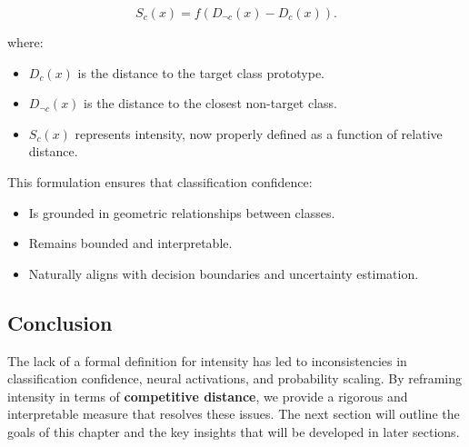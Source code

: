 \[
S_c(x) = f(D_{\neg c}(x) - D_c(x)).
\]

where:

\begin{itemize}
    \item \( D_c(x) \) is the distance to the target class prototype.
    \item \( D_{\neg c}(x) \) is the distance to the closest non-target class.
    \item \( S_c(x) \) represents intensity, now properly defined as a function of relative distance.
\end{itemize}

This formulation ensures that classification confidence:

\begin{itemize}
    \item Is grounded in geometric relationships between classes.
    \item Remains bounded and interpretable.
    \item Naturally aligns with decision boundaries and uncertainty estimation.
\end{itemize}

\subsection{Conclusion}

The lack of a formal definition for intensity has led to inconsistencies in classification confidence, neural activations, and probability scaling. By reframing intensity in terms of \textbf{competitive distance}, we provide a rigorous and interpretable measure that resolves these issues. The next section will outline the goals of this chapter and the key insights that will be developed in later sections.
